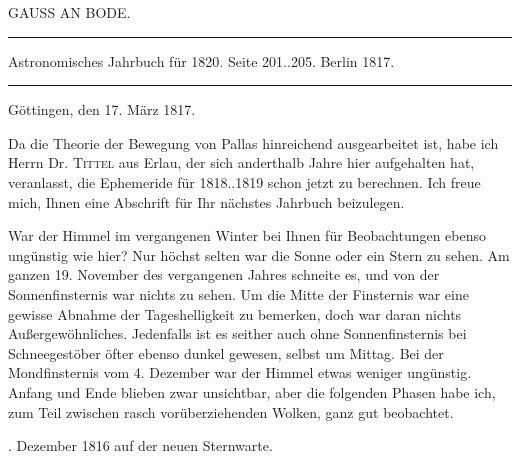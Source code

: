 \clearpage{}\hypertarget{native-404-part-lower}{}\label{native-404-part-lower}
\begin{center}\large GAUSS AN BODE.\end{center}
\begin{center}\hrule\vspace{4pt}\fontsize{10}{12}\selectfont
Astronomisches Jahrbuch für 1820. Seite 201..205. Berlin 1817.\par\vspace{4pt}\hrule\vspace{4pt}\end{center}
\begin{flushright}Göttingen, den 17. März 1817.\end{flushright}
\par\indent Da die Theorie der Bewegung von Pallas hinreichend ausgearbeitet ist, habe ich Herrn Dr. \textsc{Tittel} aus Erlau, der sich anderthalb Jahre hier aufgehalten hat, veranlasst, die Ephemeride für 1818..1819 schon  jetzt zu berechnen. Ich freue mich, Ihnen eine Abschrift für Ihr nächstes Jahrbuch beizulegen.

\par\indent War der Himmel im vergangenen Winter bei Ihnen für Beobachtungen ebenso ungünstig wie hier? Nur höchst selten war die Sonne oder ein Stern zu sehen. Am ganzen 19. November des vergangenen Jahres schneite es, und von der Sonnenfinsternis war nichts zu sehen. Um die Mitte der Finsternis war eine gewisse Abnahme der Tageshelligkeit zu bemerken, doch war daran nichts Außergewöhnliches. Jedenfalls ist es seither auch ohne Sonnenfinsternis bei Schneegestöber öfter ebenso dunkel gewesen, selbst um Mittag. Bei der Mondfinsternis vom 4. Dezember war der Himmel etwas weniger ungünstig. Anfang und Ende blieben zwar unsichtbar, aber die folgenden Phasen habe ich, zum Teil zwischen rasch vorüberziehenden Wolken, ganz gut beobachtet.

\par{}. Dezember 1816 auf der neuen Sternwarte.

